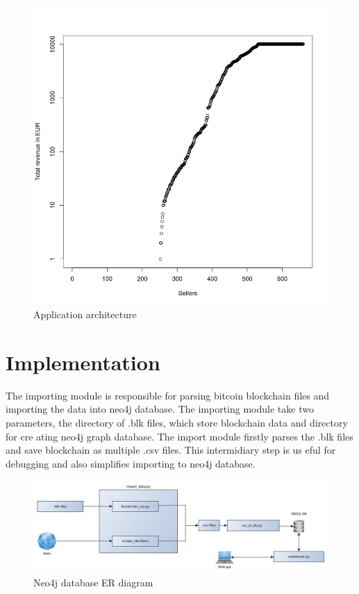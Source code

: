\documentclass[
  digital, %
  table,   %
  lof,     %
  lot,     %
  oneside
]{fithesis3}
\begin{document}
\begin{figure}[!htb]
    \centering
    \includegraphics[scale=0.4]{total-rev}
    \caption{Application architecture}
    \label{Vendors by total revenue}
\end{figure}


\section{Implementation}

The importing module is responsible for parsing bitcoin blockchain files and importing the data into neo4j database.
The importing module take two parameters, the directory of .blk files, which store blockchain data and directory for cre
ating neo4j graph database.
The import module firstly parses the .blk files and save blockchain as multiple .csv files. This intermidiary step is us
eful for debugging and also simplifies importing to neo4j database.

\begin{figure}[!htb]
    \centering
    \includegraphics[width=1\textwidth]{application_architecture}
    \caption{Neo4j database ER diagram}
    \label{application_architecture}
\end{figure}
\end{document}
